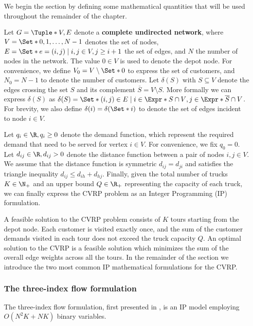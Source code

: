 We begin the section by defining some mathematical quantities that will be used throughout
the remainder of the chapter.

\medskip

Let $G = \Tuple*{V, E}$ denote a \textbf{complete undirected network}, where $V = \Set*{0, 1, \dots, N - 1}$ denotes the set of nodes,
$E = \Set*{e = (i, j) \mid \allowbreak i,j \in V, \allowbreak  j \ge i + 1}$ the set of edges, and $N$ the number of nodes in the network.
The value $0 \in V$ is used to denote the depot node.
For convenience, we define $V_0 = V \setminus \Set*{0}$ to express the set of customers, and $N_0 = N - 1$ to denote the number of customers.
Let $\delta(S)$ with $S \subseteq V$ denote the edges crossing the set $S$ and its complement $\overline{S} = V \setminus S$.
More formally we can express $\delta(S)$ as $\delta(S) = \Set*{ (i, j) \in E \mid i \in \Expr*{S \cap V}, j \in \Expr*{ \overline{S} \cap V } }$.
For brevity, we also define $\delta(i) = \delta(\Set*{i})$ to denote the set of edges incident to node $i \in V$.

Let $q_{i} \in \R, q_{i} \ge 0$ denote the demand function, which represent the required demand that need to be served for vertex $i \in V$.
For convenience, we fix $q_0 = 0$.
Let $d_{ij} \in \R, d_{ij} > 0$ denote the distance function between a pair of nodes  $i, j \in V$.
We assume that the distance function is symmetric $d_{ij} = d_{ji}$ and satisfies the triangle inequality $d_{ij} \le d_{ih} + d_{hj}$.
Finally, given the total number of trucks $K \in \N_+$ and an upper bound $Q \in \R_+$ representing the capacity of each truck, we can finally express the CVRP problem as an Integer Programming (IP) formulation.

A feasible solution to the CVRP problem consists of $K$ tours starting from the depot node.
Each customer is visited exactly once, and the sum of the customer demands visited in each tour does not exceed the truck capacity $Q$.
An optimal solution to the CVRP is a feasible solution which minimizes the sum of the overall edge weights across all the tours.
In the remainder of the section we introduce the two most common IP mathematical formulations for the CVRP.

\subsubsection{The three-index flow formulation}
\label{sec:intro-cvrp-three-index-flow-formulation}

The three-index flow formulation, first presented in \textcite{toth2002},
is an IP model employing $O(N^2 K + N K)$ binary variables.

